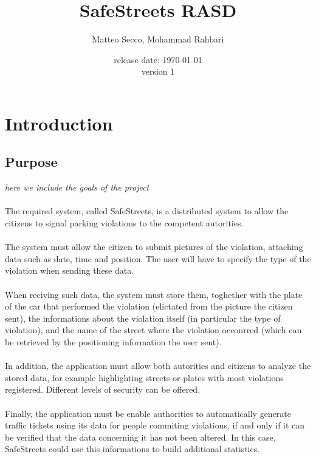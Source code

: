 \documentclass{article}
\title{SafeStreets RASD}
\date{release date: \today\\version 1}
\author{Matteo Secco, Mohammad Rahbari}
\begin{document}
\maketitle
\newpage
\tableofcontents
\pagebreak
{}


\section{Introduction}

	\subsection{Purpose} \textit{here we	 include	 the	 goals of the project}
	
		\paragraph{}The required system, called SafeStreets, is a distributed system to allow the citizens to signal parking violations to the competent autorities.
		\paragraph{}The system must allow the citizen to submit pictures of the violation, attaching data such as date, time and position. The user will have to specify the type of the violation when sending these data. 
		\paragraph{}When reciving such data, the system must store them, toghether with the plate of the car that performed the violation (elictated from the picture the citizen sent), the informations about the violation itself (in particular the type of violation), and the name of the street where the violation occourred (which can be retrieved by the positioning information the user sent).
		\paragraph{}In addition, the application must allow both autorities and citizens to analyze the stored data, for example highlighting streets or plates with most violations registered. Different levels of security can be offered.
		\paragraph{}Finally, the application must be enable authorities to automatically generate traffic tickets using its data for people commiting violations, if and only if it can be verified that the data concerning it has not been altered. In this case, SafeStreets could use this informations to build additional statistics.
\end{document}
